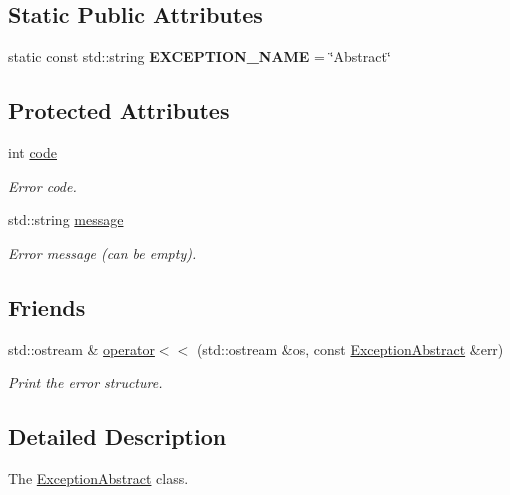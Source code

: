 \subsection*{Static Public Attributes}
\begin{DoxyCompactItemize}
\item 
static const std\+::string {\bfseries E\+X\+C\+E\+P\+T\+I\+O\+N\+\_\+\+N\+A\+ME} = \char`\"{}Abstract\char`\"{}\hypertarget{classdynamic__graph_1_1ExceptionAbstract_a3fe66d505c81575f26360298171c9e50}{}\label{classdynamic__graph_1_1ExceptionAbstract_a3fe66d505c81575f26360298171c9e50}

\end{DoxyCompactItemize}
\subsection*{Protected Attributes}
\begin{DoxyCompactItemize}
\item 
int \hyperlink{classdynamic__graph_1_1ExceptionAbstract_a160cf3cd35aad75738f8b26c5cec6fdc}{code}
\begin{DoxyCompactList}\small\item\em Error code. \end{DoxyCompactList}\item 
std\+::string \hyperlink{classdynamic__graph_1_1ExceptionAbstract_a9622b93d152c08ab80ed4b48ea24380b}{message}
\begin{DoxyCompactList}\small\item\em Error message (can be empty). \end{DoxyCompactList}\end{DoxyCompactItemize}
\subsection*{Friends}
\begin{DoxyCompactItemize}
\item 
std\+::ostream \& \hyperlink{classdynamic__graph_1_1ExceptionAbstract_af1ab4fed15cda5c7de2c9c4f809bd611}{operator$<$$<$} (std\+::ostream \&os, const \hyperlink{classdynamic__graph_1_1ExceptionAbstract}{Exception\+Abstract} \&err)
\begin{DoxyCompactList}\small\item\em Print the error structure. \end{DoxyCompactList}\end{DoxyCompactItemize}


\subsection{Detailed Description}
The \hyperlink{classdynamic__graph_1_1ExceptionAbstract}{Exception\+Abstract} class. 

